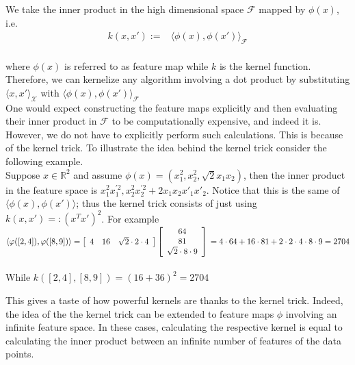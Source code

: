 We take the inner product in the high dimensional space $\mathcal{F}$ mapped by $\phi(x)$, i.e.\
\\
\begin{align*}
k(x,x'):=&\langle \phi(x), \phi(x') \rangle_{\mathcal{F}}
\end{align*}
\\
where $\phi(x)$ is referred to as feature map while $k$ is the kernel function.
\\
Therefore, we can kernelize any algorithm involving a dot product by substituting $\langle x, x' \rangle_{\mathcal{X}}$ with $\langle \phi(x), \phi(x') \rangle_{\mathcal{F}}$
\\
One would expect constructing the feature maps explicitly and then evaluating their inner product in $\mathcal{F}$ to be computationally expensive, and indeed it is. However, we do not have to explicitly perform such calculations. This is because of the kernel trick.
To illustrate the idea behind the kernel trick consider the following example. 
\\
Suppose $x \in \mathbb{R}^2$ and assume $\phi(x)=(x_{1}^{2},x_{2}^{2},\sqrt{2}x_{1}x_{2})$, then the inner product in the feature space is $x_{1}^{2}x_{1}^{'2},x_{2}^{2}x_{2}^{'2}+2x_{1}x_{2}x'_{1}x'_{2}$.
Notice that this is the same of $\langle \phi(x), \phi(x') \rangle$; thus the kernel trick consists of just using $k(x,x')=:(x^Tx')^2$.
For example
\\
$\langle \phi([2,4]),\phi([8,9]) \rangle=  \left[ {\begin{array}{cccc}
    4 & 16 &     \sqrt{2}\cdot 2 \cdot 4\\
  \end{array} } \right]
  \left[ {\begin{array}{cccc}
    64\\
    81\\
    \sqrt{2}\cdot8 \cdot 9
    \\
  \end{array} } \right]\\=4\cdot 64 +16\cdot 81 +2 \cdot 2 \cdot 4 \cdot 8 \cdot 9=2704
$
\\
\\
While $k([2,4], [8,9])=(16+36)^2=2704$

This gives a taste of how powerful kernels are thanks to the kernel trick.
Indeed, the idea of the the kernel trick can be extended to feature maps
$\phi$ involving an infinite feature space. In these cases, calculating the
respective kernel is equal to calculating the inner product between an infinite
number of features of the data points.




